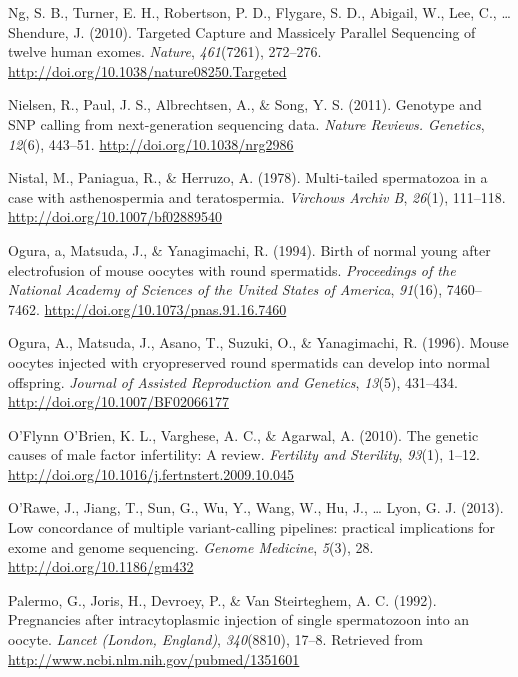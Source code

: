 \documentclass[12pt,twoside]{reedthesis}
\theoremstyle{definition}
\theoremstyle{definition}
\theoremstyle{remark}
\begin{document}
  \hypertarget{ref-Ng2010}{}
  Ng, S. B., Turner, E. H., Robertson, P. D., Flygare, S. D., Abigail, W.,
  Lee, C., \ldots{} Shendure, J. (2010). Targeted Capture and Massicely
  Parallel Sequencing of twelve human exomes. \emph{Nature},
  \emph{461}(7261), 272--276.
  \url{http://doi.org/10.1038/nature08250.Targeted}
  
  \hypertarget{ref-Nielsen2011}{}
  Nielsen, R., Paul, J. S., Albrechtsen, A., \& Song, Y. S. (2011).
  Genotype and SNP calling from next-generation sequencing data.
  \emph{Nature Reviews. Genetics}, \emph{12}(6), 443--51.
  \url{http://doi.org/10.1038/nrg2986}
  
  \hypertarget{ref-Nistal}{}
  Nistal, M., Paniagua, R., \& Herruzo, A. (1978). Multi-tailed
  spermatozoa in a case with asthenospermia and teratospermia.
  \emph{Virchows Archiv B}, \emph{26}(1), 111--118.
  \url{http://doi.org/10.1007/bf02889540}
  
  \hypertarget{ref-Ogura1994}{}
  Ogura, a, Matsuda, J., \& Yanagimachi, R. (1994). Birth of normal young
  after electrofusion of mouse oocytes with round spermatids.
  \emph{Proceedings of the National Academy of Sciences of the United
  States of America}, \emph{91}(16), 7460--7462.
  \url{http://doi.org/10.1073/pnas.91.16.7460}
  
  \hypertarget{ref-Kimura1995}{}
  Ogura, A., Matsuda, J., Asano, T., Suzuki, O., \& Yanagimachi, R.
  (1996). Mouse oocytes injected with cryopreserved round spermatids can
  develop into normal offspring. \emph{Journal of Assisted Reproduction
  and Genetics}, \emph{13}(5), 431--434.
  \url{http://doi.org/10.1007/BF02066177}
  
  \hypertarget{ref-OFlynnOBrien2010}{}
  O'Flynn O'Brien, K. L., Varghese, A. C., \& Agarwal, A. (2010). The
  genetic causes of male factor infertility: A review. \emph{Fertility and
  Sterility}, \emph{93}(1), 1--12.
  \url{http://doi.org/10.1016/j.fertnstert.2009.10.045}
  
  \hypertarget{ref-ORawe2013}{}
  O'Rawe, J., Jiang, T., Sun, G., Wu, Y., Wang, W., Hu, J., \ldots{} Lyon,
  G. J. (2013). Low concordance of multiple variant-calling pipelines:
  practical implications for exome and genome sequencing. \emph{Genome
  Medicine}, \emph{5}(3), 28. \url{http://doi.org/10.1186/gm432}
  
  \hypertarget{ref-Palermo1992}{}
  Palermo, G., Joris, H., Devroey, P., \& Van Steirteghem, A. C. (1992).
  Pregnancies after intracytoplasmic injection of single spermatozoon into
  an oocyte. \emph{Lancet (London, England)}, \emph{340}(8810), 17--8.
  Retrieved from \url{http://www.ncbi.nlm.nih.gov/pubmed/1351601}
  
\end{document}

